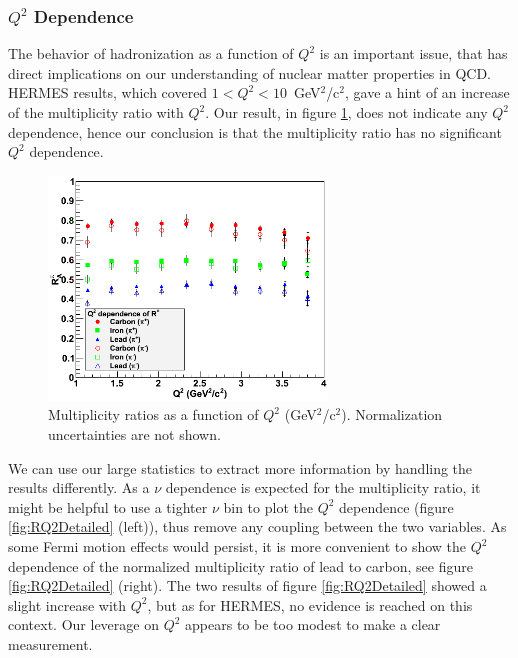 \subsubsection{$Q^2$ Dependence}

The behavior of hadronization as a function of $Q^2$ is an important issue, that 
has direct implications on our understanding of nuclear matter properties in 
QCD. HERMES results, which covered $1<Q^2<10$~GeV$^2$/c$^2$, gave a hint of an 
increase of the multiplicity ratio with $Q^2$. Our result, in figure 
\ref{fig:RQ2}, does not indicate any $Q^2$ dependence, hence our 
conclusion is that the multiplicity ratio has no significant $Q^2$ dependence.

\begin{figure}[tbp]
\centering
\includegraphics[width=7.4cm] {chap6-fig/F_RvQ2.png} 
\caption {Multiplicity ratios as a function of $Q^2$ (GeV$^2$/c$^2$). 
Normalization uncertainties are not shown.}
\label{fig:RQ2}
\end{figure}

We can use our large statistics to extract more information by handling the results differently. As a $\nu$ dependence is expected for the multiplicity ratio, it might be helpful to use a tighter $\nu$ bin to plot the $Q^2$ dependence (figure \ref{fig:RQ2Detailed} (left)), thus remove any coupling between the two variables.
As some Fermi motion effects would persist, it is more convenient to show the $Q^2$ dependence of the normalized multiplicity ratio of lead to carbon, see figure \ref{fig:RQ2Detailed} (right). The two results of figure \ref{fig:RQ2Detailed} 
showed a slight increase with $Q^2$, but as for HERMES, no evidence is 
reached on this context. Our leverage on $Q^2$ appears to be too modest to make a clear measurement. 

